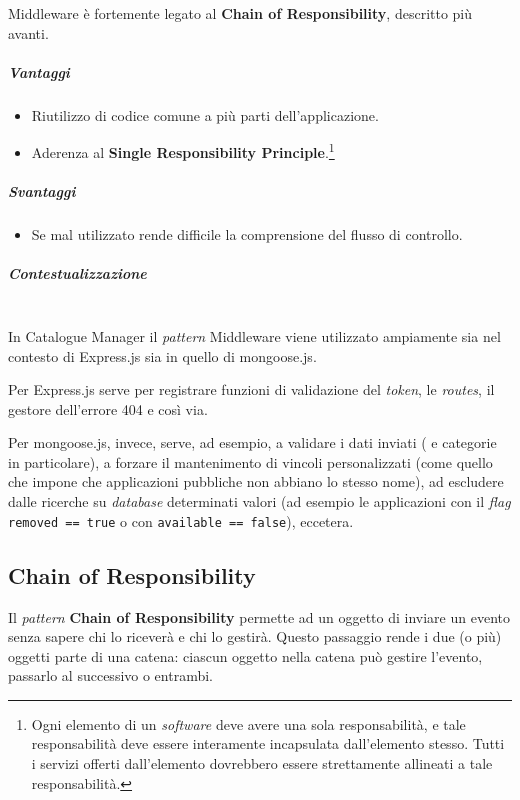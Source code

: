 Middleware è fortemente legato al \textbf{Chain of Responsibility}, descritto più avanti.

\subparagraph{Vantaggi}
\begin{itemize}
\item Riutilizzo di codice comune a più parti dell'applicazione.
\item Aderenza al \textbf{Single Responsibility Principle}.\footnote{Ogni elemento di un \textit{software} deve avere una sola responsabilità, e tale responsabilità deve essere interamente incapsulata dall'elemento stesso. Tutti i servizi offerti dall'elemento dovrebbero essere strettamente allineati a tale responsabilità.}
\end{itemize}

\subparagraph{Svantaggi}
\begin{itemize}
\item Se mal utilizzato rende difficile la comprensione del flusso di controllo.
\end{itemize}

\subparagraph{Contestualizzazione}\mbox{} \\
In Catalogue Manager il \textit{pattern} Middleware viene utilizzato ampiamente sia nel contesto di Express.js sia in quello di mongoose.js.

Per Express.js serve per registrare funzioni di validazione del \textit{token}, le \textit{routes}, il gestore dell'errore 404 e così via.

Per mongoose.js, invece, serve, ad esempio, a validare i dati inviati ( e categorie in particolare), a forzare il mantenimento di vincoli personalizzati (come quello che impone che applicazioni pubbliche non abbiano lo stesso nome), ad escludere dalle ricerche su \textit{database} determinati valori (ad esempio le applicazioni con il \textit{flag} \texttt{removed == true} o con \texttt{available == false}), eccetera. 

\subsection{Chain of Responsibility}
Il \textit{pattern} \textbf{Chain of Responsibility} permette ad un oggetto di inviare un evento senza sapere chi lo riceverà e chi lo gestirà. Questo passaggio rende i due (o più) oggetti parte di una catena: ciascun oggetto nella catena può gestire l'evento, passarlo al successivo o entrambi. 


